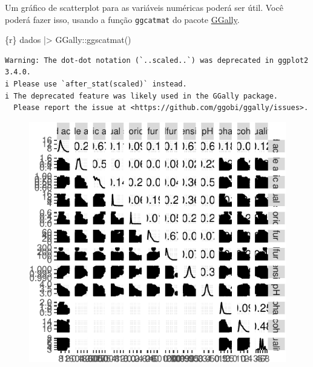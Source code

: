 \documentclass[
  letterpaper,
  DIV=11,
  numbers=noendperiod,
  oneside]{scrartcl}
\newenvironment{Shaded}{\begin{snugshade}}{\end{snugshade}}
\newcommand{\FunctionTok}[1]{\textcolor[rgb]{0.28,0.35,0.67}{#1}}
\newcommand{\InformationTok}[1]{\textcolor[rgb]{0.37,0.37,0.37}{#1}}
\newcommand{\NormalTok}[1]{\textcolor[rgb]{0.00,0.23,0.31}{#1}}
\newcommand{\SpecialCharTok}[1]{\textcolor[rgb]{0.37,0.37,0.37}{#1}}
\begin{document}
Um gráfico de scatterplot para as variáveis numéricas poderá ser útil.
Você poderá fazer isso, usando a função \texttt{ggcatmat} do pacote
\href{https://ggobi.github.io/ggally/index.html}{GGally}.

\begin{Shaded}
\begin{Highlighting}[]
\InformationTok{\textasciigrave{}\textasciigrave{}\textasciigrave{}\{r\}}
\NormalTok{dados }\SpecialCharTok{|\textgreater{}} 
\NormalTok{  GGally}\SpecialCharTok{::}\FunctionTok{ggscatmat}\NormalTok{()}
\InformationTok{\textasciigrave{}\textasciigrave{}\textasciigrave{}}
\end{Highlighting}
\end{Shaded}

\begin{verbatim}
Warning: The dot-dot notation (`..scaled..`) was deprecated in ggplot2 3.4.0.
i Please use `after_stat(scaled)` instead.
i The deprecated feature was likely used in the GGally package.
  Please report the issue at <https://github.com/ggobi/ggally/issues>.
\end{verbatim}

\begin{figure}[H]

{\centering \includegraphics{tufte_svm_regressao_files/figure-pdf/unnamed-chunk-6-1.pdf}

}

\end{figure}
\end{document}
